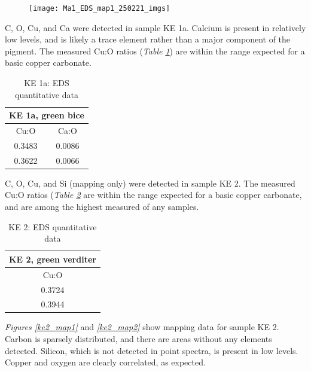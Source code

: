 \begin{figure}[H]
\centering
  \texttt{[image: Ma1\_EDS\_map1\_250221\_imgs]}
\label{fig:ma1_map1}
\end{figure}


C, O, Cu, and Ca were detected in sample KE 1a. Calcium is present in relatively low levels, and is likely a trace element rather than a major component of the pigment. The measured Cu:O ratios (\textit{Table \ref{table:ke1a_ratios}}) are within the range expected for a basic copper carbonate.

\begin{table}[H]
\caption{KE 1a: EDS quantitative data}
\centering
\label{table:ke1a_ratios}
\begin{tabular}{c c}
\toprule
\multicolumn{2}{c}{KE 1a, green bice} \\
\midrule
Cu:O & Ca:O \\
\midrule
0.3483 & 0.0086 \\
0.3622 & 0.0066 \\
\bottomrule
\end{tabular}
\end{table}


C, O, Cu, and Si (mapping only) were detected in sample KE 2. The measured Cu:O ratios (\textit{Table \ref{table:ke2_ratios}} are within the range expected for a basic copper carbonate, and are among the highest measured of any samples.

\begin{table}[H]
\caption{KE 2: EDS quantitative data}
\centering
\label{table:ke2_ratios}
\begin{tabular}{c}
\toprule
KE 2, green verditer \\
\midrule
Cu:O \\
\midrule
0.3724 \\
0.3944 \\
\bottomrule
\end{tabular}
\end{table}

\textit{Figures \ref{ke2_map1}} and \textit{\ref{ke2_map2}} show mapping data for sample KE 2. Carbon is sparsely distributed, and there are areas without any elements detected. Silicon, which is not detected in point spectra, is present in low levels. Copper and oxygen are clearly correlated, as expected.

